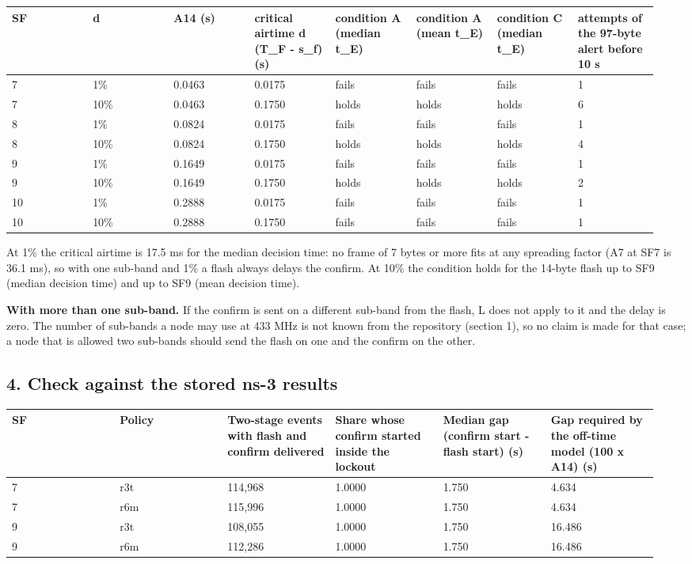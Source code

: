 {\scriptsize\raggedright
\begin{longtable}{p{0.119\linewidth}p{0.119\linewidth}p{0.119\linewidth}p{0.119\linewidth}p{0.119\linewidth}p{0.119\linewidth}p{0.119\linewidth}p{0.119\linewidth}}
\toprule
SF & d & A14 (s) & critical airtime d (T\_F - s\_f) (s) & condition A (median t\_E) & condition A (mean t\_E) & condition C (median t\_E) & attempts of the 97-byte alert before 10 s \\
\midrule
\endhead
7 & 1\% & 0.0463 & 0.0175 & fails & fails & fails & 1 \\
7 & 10\% & 0.0463 & 0.1750 & holds & holds & holds & 6 \\
8 & 1\% & 0.0824 & 0.0175 & fails & fails & fails & 1 \\
8 & 10\% & 0.0824 & 0.1750 & holds & holds & holds & 4 \\
9 & 1\% & 0.1649 & 0.0175 & fails & fails & fails & 1 \\
9 & 10\% & 0.1649 & 0.1750 & holds & holds & holds & 2 \\
10 & 1\% & 0.2888 & 0.0175 & fails & fails & fails & 1 \\
10 & 10\% & 0.2888 & 0.1750 & fails & fails & fails & 1 \\
\bottomrule
\end{longtable}}

At 1\% the critical airtime is 17.5 ms for the median decision time: no frame of 7 bytes or more fits at any spreading factor (A7 at SF7 is 36.1 ms), so with one sub-band and 1\% a flash always delays the confirm. At 10\% the condition holds for the 14-byte flash up to SF9 (median decision time) and up to SF9 (mean decision time).

\textbf{With more than one sub-band.} If the confirm is sent on a different sub-band from the flash, L does not apply to it and the delay is zero. The number of sub-bands a node may use at 433 MHz is not known from the repository (section 1), so no claim is made for that case; a node that is allowed two sub-bands should send the flash on one and the confirm on the other.

\subsection*{4. Check against the stored ns-3 results}

{\scriptsize\raggedright
\begin{longtable}{p{0.158\linewidth}p{0.158\linewidth}p{0.158\linewidth}p{0.158\linewidth}p{0.158\linewidth}p{0.158\linewidth}}
\toprule
SF & Policy & Two-stage events with flash and confirm delivered & Share whose confirm started inside the lockout & Median gap (confirm start - flash start) (s) & Gap required by the off-time model (100 x A14) (s) \\
\midrule
\endhead
7 & r3t & 114,968 & 1.0000 & 1.750 & 4.634 \\
7 & r6m & 115,996 & 1.0000 & 1.750 & 4.634 \\
9 & r3t & 108,055 & 1.0000 & 1.750 & 16.486 \\
9 & r6m & 112,286 & 1.0000 & 1.750 & 16.486 \\
\bottomrule
\end{longtable}}

